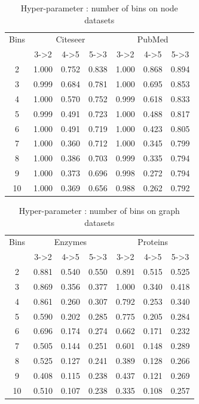 \documentclass[sigconf]{acmart}
\begin{document}
\begin{table}[h]
  \caption{Hyper-parameter : number of bins on node datasets}
  \label{tab:commands}
  \begin{tabular}{*{7}{c}} \toprule
{Bins}  & \multicolumn{3}{c}{{\sc Citeseer}} & \multicolumn{3}{c}{{\sc PubMed}} \\
\cmidrule(lr){2-4}\cmidrule(lr){5-7}
& 3->2 & 4->5 & 5->3 & 3->2 & 4->5 & 5->3 \\ \hline
2 & 1.000& 0.752 & 0.838 & 1.000  & 0.868 & 0.894\\
3 & 0.999& 0.684 & 0.781 & 1.000  & 0.695 & 0.853\\
4 & 1.000& 0.570 & 0.752& 0.999 & 0.618 & 0.833\\
5 & 0.999& 0.491 & 0.723& 1.000  & 0.488 & 0.817\\
6 & 1.000& 0.491 & 0.719& 1.000 & 0.423 & 0.805\\
7 & 1.000& 0.360 & 0.712& 1.000  & 0.345 & 0.799\\
8 & 1.000& 0.386 & 0.703& 0.999 & 0.335 & 0.794 \\
9 & 1.000& 0.373 & 0.696& 0.998  & 0.272 & 0.794\\
10 & 1.000& 0.369 & 0.656& 0.988 &0.262 & 0.792\\
\bottomrule
  \end{tabular}
\end{table}
\begin{table}[htb]
  \caption{Hyper-parameter : number of bins on graph datasets}
  \label{tab:commands}
  \begin{tabular}{*{7}{c}} \toprule
{Bins}  & \multicolumn{3}{c}{{\sc Enzymes}} & \multicolumn{3}{c}{{\sc Proteins}} \\
\cmidrule(lr){2-4}\cmidrule(lr){5-7}
& 3->2 & 4->5 & 5->3 & 3->2 & 4->5 & 5->3 \\ \hline
2 & 0.881 & 0.540 & 0.550 & 0.891 & 0.515 & 0.525\\
3 & 0.869 & 0.356 & 0.377 & 1.000 & 0.340 & 0.418\\
4 & 0.861 & 0.260 & 0.307 & 0.792 & 0.253 & 0.340\\
5 & 0.590 & 0.202 & 0.285 & 0.775 & 0.205 & 0.284\\
6 & 0.696 & 0.174 & 0.274 & 0.662 & 0.171 & 0.232\\
7 & 0.505 & 0.144 & 0.251 & 0.601 & 0.148 & 0.289\\
8 & 0.525 & 0.127 & 0.241 & 0.389 & 0.128 & 0.266\\
9 & 0.408 & 0.115 & 0.238 & 0.437 & 0.121 & 0.269\\
10 & 0.510 & 0.107 & 0.238 & 0.335 & 0.108 & 0.257\\

\bottomrule
  \end{tabular}
\end{table}
\end{document}
